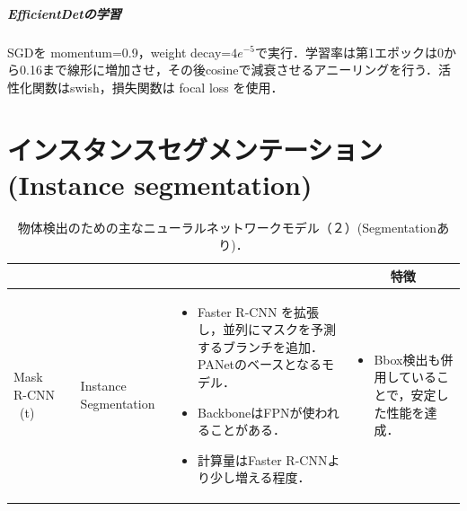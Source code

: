 \documentclass[twocolumn]{jsarticle} %
\begin{document}
\subparagraph{EfficientDetの学習}
SGDを momentum=0.9，weight decay=$4e^{-5}$で実行．学習率は第1エポックは0から0.16まで線形に増加させ，その後cosineで減衰させるアニーリングを行う．活性化関数はswish，損失関数は focal loss を使用．


\section{インスタンスセグメンテーション(Instance segmentation)}
\begin{table}
    \caption{物体検出のための主なニューラルネットワークモデル（２）(Segmentationあり)．}
    \label{tbl-cheat2}
    \begin{center}
        \setlength{\tabcolsep}{3pt}
        \footnotesize
        \begin{tabularx}{\linewidth}{Xp{1.5cm}Xp{7cm}X} \toprule
            \centering{モデル名称} & \centering{文献} & \centering{用途} & \centering{概要} & \multicolumn{1}{c}{特徴} \\ \midrule

            Mask R-CNN \ (t)\footnote[1] & \cite{HGDG17} & Instance Segmentation & 
            \begin{itemize}
                \vspace{-0.7\baselineskip}
                \setlength{\leftskip}{-3mm}
                \item Faster R-CNN を拡張し，並列にマスクを予測するブランチを追加．PANetのベースとなるモデル．
                \item BackboneはFPNが使われることがある．
                \item 計算量はFaster R-CNNより少し増える程度．
            \end{itemize}
            &
            \begin{itemize}
                \vspace{-0.7\baselineskip}
                \setlength{\leftskip}{-3mm}
                \item Bbox検出も併用していることで，安定した性能を達成．
            \end{itemize}
            \\


\end{tabularx}
\end{center}
\end{table}
\end{document}
